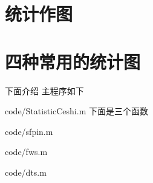 \documentclass{hfutpaper}
\begin{document}
\section{统计作图}
\section*{四种常用的统计图}
下面介绍
主程序如下

{code/StatisticCeshi.m}
下面是三个函数

{code/sfpin.m}

{code/fws.m}

{code/dts.m}
\end{document}
